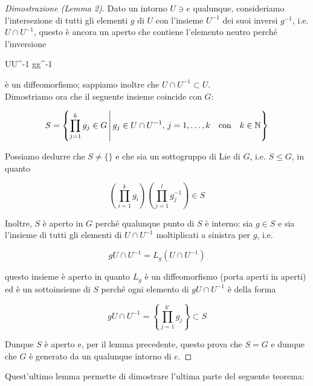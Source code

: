 \begin{proof}[Dimostrazione (Lemma 2)]
	Dato un intorno $ U \ni e $ qualunque, consideriamo l'intersezione di tutti gli elementi $ g $ di $ U $ con l'insieme $ U^{-1} $ dei suoi inversi $ g^{-1} $, i.e. $ U \cap U^{-1} $,  questo è ancora un aperto che contiene l'elemento neutro perché l'inversione
	
	{U}{U^{-1}}%
	{g}{g^{-1}}
	
	è un diffeomorfismo; sappiamo inoltre che $ U \cap U^{-1} \subset U $.\\
	Dimostriamo ora che il seguente insieme coincide con $ G $:
	
	\begin{equation}
		S = \left\{ \prod_{j=1}^{k} g_{j} \in G \, \middle| \, g_{j} \in U \cap U^{-1}, \, j=1,\dots,k \qq{con} k \in \N \right\}
	\end{equation}
	
	Possiamo dedurre che $ S \neq \{\} $ e che sia un sottogruppo di Lie di $ G $, i.e. $ S \leqslant G $, in quanto
	
	\begin{equation}
		\left( \prod_{i=1}^{k} g_{i} \right) \left( \prod_{j=1}^{l} g_{j}^{-1} \right) \in S
	\end{equation}
	
	Inoltre, $ S $ è aperto in $ G $ perché qualunque punto di $ S $ è interno: sia $ g \in S $ e sia l'insieme di tutti gli elementi di $ U \cap U^{-1} $ moltiplicati a sinistra per $ g $, i.e.
	
	\begin{equation}
		g U \cap U^{-1} = L_{g}(U \cap U^{-1})
	\end{equation}
	
	questo insieme è aperto in quanto $ L_{g} $ è un diffeomorfismo (porta aperti in aperti) ed è un sottoinsieme di $ S $ perché ogni elemento di $ g U \cap U^{-1} $ è della forma
	
	\begin{equation}
		g U \cap U^{-1} = \left\{ \prod_{j=1}^{k'} g_{j} \right\} \subset S
	\end{equation}
	
	Dunque $ S $ è aperto e, per il lemma precedente, questo prova che $ S = G $ e dunque che $ G $ è generato da un qualunque intorno di $ e $.
\end{proof}

Quest'ultimo lemma permette di dimostrare l'ultima parte del seguente teorema:

